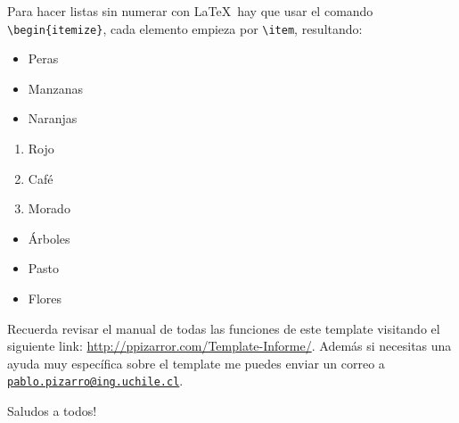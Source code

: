 		Para hacer listas sin numerar con \LaTeX\ hay que usar el comando \texttt{\textbackslash begin\{itemize\}}, cada elemento empieza por \texttt{\textbackslash item}, resultando:
		
		\begin{multicols}{3}
			\begin{itemize}[label={--}]
				\item Peras
				\item Manzanas
				\item Naranjas
			\end{itemize}
			
			\begin{enumerate}[label={*}]
				\item Rojo
				\item Café
				\item Morado
			\end{enumerate}
			
			\begin{itemize}
				\item Árboles
				\item Pasto
				\item Flores
			\end{itemize}
		\end{multicols}
		
		
		Recuerda revisar el manual de todas las funciones de este template visitando el siguiente link: \url{http://ppizarror.com/Template-Informe/}. Además si necesitas una ayuda muy específica sobre el template me puedes enviar un correo a \href{mailto:pablo.pizarro@ing.uchile.cl}{\texttt{pablo.pizarro@ing.uchile.cl}}.
		
		\newp \textcolor{awesome}{Saludos a todos!} \smiley